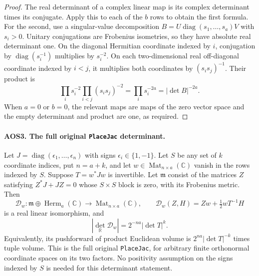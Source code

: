 \begin{proof}
The real determinant of a complex linear map is its complex
determinant times its conjugate.  Apply this to each of the $b$ rows
to obtain the first formula.  For the second, use a singular-value
decomposition $B=U\operatorname{diag}(s_1,\ldots,s_a)V$ with $s_i>0$.
Unitary conjugations are Frobenius isometries, so they have absolute
real determinant one.  On the diagonal Hermitian coordinate indexed
by $i$, conjugation by $\operatorname{diag}(s_i^{-1})$ multiplies by
$s_i^{-2}$.  On each two-dimensional real off-diagonal coordinate
indexed by $i<j$, it multiplies both coordinates by $(s_is_j)^{-1}$.
Their product is
\[
       \prod_i s_i^{-2}\prod_{i<j}(s_is_j)^{-2}
          =\prod_i s_i^{-2a}=|\det B|^{-2a}.
 \tag{AOS.8}
\]
When $a=0$ or $b=0$, the relevant maps are maps of the zero vector
space and the empty determinant and product are one, as required.
\end{proof}

\paragraph{AOS3. The full original \texttt{PlaceJac} determinant.}
\label{claim:AOS3}
Let $J=\operatorname{diag}(\epsilon_1,\ldots,\epsilon_n)$ with signs
$\epsilon_i\in\{1,-1\}$.  Let $S$ be any set of $k$ coordinate
indices, put $n=a+k$, and let $w\in\operatorname{Mat}_{n\times a}
(\mathbb C)$ vanish in the rows indexed by $S$.  Suppose
$T=w^*Jw$ is invertible.  Let $\mathfrak m$ consist of the matrices
$Z$ satisfying $Z^*J+JZ=0$ whose $S\times S$ block is zero, with its
Frobenius metric.  Then
\[
 \mathcal D_w:\mathfrak m\oplus\operatorname{Herm}_a(\mathbb C)
       \longrightarrow\operatorname{Mat}_{n\times a}(\mathbb C),
 \qquad
 \mathcal D_w(Z,H)=Zw+\tfrac12wT^{-1}H
 \tag{AOS.9}
\]
is a real linear isomorphism, and
\[
        |\det_{\mathbb R}\mathcal D_w|
                =2^{-na}|\det T|^k.
 \tag{AOS.10}
\]
Equivalently, its pushforward of product Euclidean volume is
$2^{na}|\det T|^{-k}$ times tuple volume.  This is the full original
\texttt{PlaceJac}, for arbitrary finite orthonormal coordinate
spaces on its two factors.  No positivity assumption on the signs
indexed by $S$ is needed for this determinant statement.

